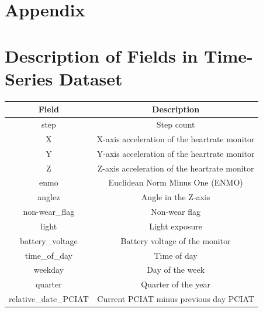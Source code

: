 \begin{appendices}
    \section*{Appendix}


    \section{Description of Fields in Time-Series Dataset}
    \begin{table}[h!]
        \centering
        \begin{tabular}{|c|c|}
        \hline
        \textbf{Field} & \textbf{Description} \\
        \hline
        step & Step count \\
        X & X-axis acceleration of the heartrate monitor \\
        Y & Y-axis acceleration of the heartrate monitor \\
        Z & Z-axis acceleration of the heartrate monitor \\
        enmo & Euclidean Norm Minus One (ENMO) \\
        anglez & Angle in the Z-axis \\
        non-wear\_flag & Non-wear flag \\
        light & Light exposure \\
        battery\_voltage & Battery voltage of the monitor \\
        time\_of\_day & Time of day \\
        weekday & Day of the week \\
        quarter & Quarter of the year \\
        relative\_date\_PCIAT & Current PCIAT minus previous day PCIAT \\
        \hline
        \end{tabular}
        \label{table:fields}
    \end{table}


\end{appendices}
